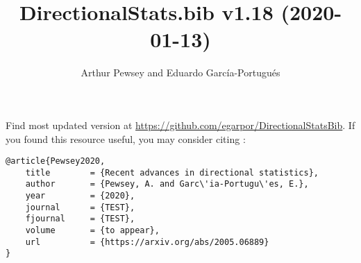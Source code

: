 \documentclass[10pt]{article}
\title{DirectionalStats.bib v1.18 (2020-01-13)}
\author{Arthur Pewsey and Eduardo García-Portugués}
\date{}
\begin{document}
\maketitle

Find most updated version at \url{https://github.com/egarpor/DirectionalStatsBib}. If you found this resource useful, you may consider citing \cite{Pewsey2020}:
\begin{verbatim}
@article{Pewsey2020,
    title        = {Recent advances in directional statistics},
    author       = {Pewsey, A. and Garc\'ia-Portugu\'es, E.},
    year         = {2020},
    journal      = {TEST},
    fjournal     = {TEST},
    volume       = {to appear},
    url          = {https://arxiv.org/abs/2005.06889}
}
\end{verbatim}

\nocite{*}

\setlength\bibsep{0cm}
\setlength\bibhang{0.25cm}



\end{document}
